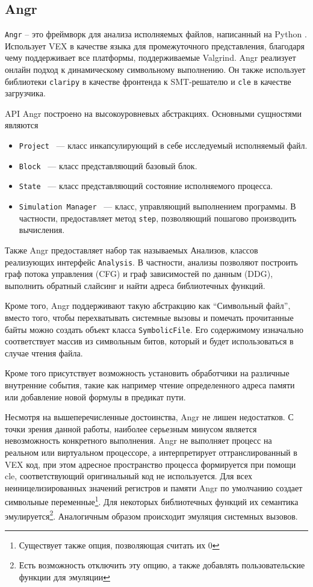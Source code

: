 \subsection{Angr}

\texttt{Angr} -- это фреймворк для анализа исполняемых файлов, написанный на Python \cite{Angr}. Использует VEX в качестве языка для промежуточного представления, благодаря чему поддерживает все платформы, поддерживаемые Valgrind.
Angr реализует онлайн подход к динамическому символьному выполнению. Он также использует библиотеки \texttt{claripy} в качестве фронтенда к SMT-решателю и \texttt{cle} в качестве загрузчика.

API Angr построено на высокоуровневых абстракциях. Основными сущностями являются
\begin{itemize}
    \item \texttt{Project} ~--- класс инкапсулирующий в себе исследуемый исполняемый файл.
    \item \texttt{Block} ~--- класс представляющий базовый блок.
    \item \texttt{State} ~--- класс представляющий состояние исполняемого процесса.
    \item \texttt{Simulation Manager} ~--- класс, управляющий выполнением программы. В частности, предоставляет метод \texttt{step}, позволяющий пошагово производить вычисления.
\end{itemize}

Также Angr предоставляет набор так называемых Анализов, классов реализующих интерфейс \texttt{Analysis}. В частности, анализы позволяют построить граф потока управления (CFG) и граф зависимостей по данным (DDG), выполнить обратный слайсинг и найти адреса библиотечных функций.

Кроме того, Angr поддерживают такую абстракцию как ``Символьный файл'', вместо того, чтобы перехватывать системные вызовы и помечать прочитанные байты можно создать объект класса \texttt{SymbolicFile}. Его содержимому изначально соответствует массив из символьным битов, который и будет использоваться в случае чтения файла.

Кроме того присутствует возможность установить обработчики на различные внутренние события, такие как например чтение определенного адреса памяти или добавление новой формулы в предикат пути.

Несмотря на вышеперечисленные достоинства, Angr не лишен недостатков. С точки зрения данной работы, наиболее серьезным минусом является невозможность конкретного выполнения. Angr не выполняет процесс на реальном или виртуальном процессоре, а интерпретирует оттранслированный в VEX код, при этом адресное пространство процесса формируется при помощи cle, соответствующий оригинальный код не используется. Для всех неиницелизированных значений регистров и памяти Angr по умолчанию создает символьные переменные\footnote{Существует также опция, позволяющая считать их 0}. Для некоторых библиотечных функций их семантика эмулируется\footnote{Есть возможность отключить эту опцию, а также добавлять пользовательские функции для эмуляции}. Аналогичным образом происходит эмуляция системных вызовов.


